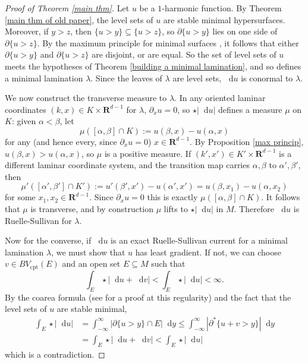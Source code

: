 \documentclass[reqno,11pt]{amsart}
\newcommand{\RR}{\mathbf{R}}
\newcommand*\dif{\mathop{}\!\mathrm{d}}
\newcommand{\cpt}{\mathrm{cpt}}
\theoremstyle{definition}
\numberwithin{equation}{section}
\begin{document}
\begin{proof}[Proof of Theorem \ref{main thm}]
Let $u$ be a $1$-harmonic function.
By Theorem \ref{main thm of old paper}, the level sets of $u$ are stable minimal hypersurfaces.
Moreover, if $y > z$, then $\{u > y\} \subseteq \{u > z\}$, so $\partial \{u > y\}$ lies on one side of $\partial \{u > z\}$.
By the maximum principle for minimal surfaces \cite[Corollary 1.28]{colding2011course}, it follows that either $\partial \{u > y\}$ and $\partial \{u > z\}$ are disjoint, or are equal.
So the set of level sets of $u$ meets the hypotheses of Theorem \ref{building a minimal lamination}, and so defines a minimal lamination $\lambda$.
Since the leaves of $\lambda$ are level sets, $\dif u$ is conormal to $\lambda$.

We now construct the transverse measure to $\lambda$.
In any oriented laminar coordinates $(k, x) \in K \times \RR^{d - 1}$ for $\lambda$, $\partial_x u = 0$, so $\star |\dif u|$ defines a measure $\mu$ on $K$: given $\alpha < \beta$, let
$$\mu([\alpha, \beta] \cap K) := u(\beta, x) - u(\alpha, x)$$
for any (and hence every, since $\partial_x u = 0$) $x \in \RR^{d - 1}$.
By Proposition \ref{max princip}, $u(\beta, x) > u(\alpha, x)$, so $\mu$ is a positive measure.
If $(k', x') \in K' \times \RR^{d - 1}$ is a different laminar coordinate system, and the transition map carries $\alpha, \beta$ to $\alpha', \beta'$, then
$$\mu'([\alpha', \beta'] \cap K') := u'(\beta', x') - u(\alpha', x') = u(\beta, x_1) - u(\alpha, x_2)$$
for some $x_1, x_2 \in \RR^{d - 1}$. Since $\partial_x u = 0$ this is exactly $\mu([\alpha, \beta] \cap K)$.
It follows that $\mu$ is transverse, and by construction $\mu$ lifts to $\star |\dif u|$ in $M$.
Therefore $\dif u$ is Ruelle-Sullivan for $\lambda$.

Now for the converse, if $\dif u$ is an exact Ruelle-Sullivan current for a minimal lamination $\lambda$, we must show that $u$ has least gradient.
If not, we can choose $v \in BV_\cpt(E)$ and an open set $E \subseteq M$ such that
$$\int_E \star |\dif u + \dif v| < \int_E \star |\dif u| < \infty.$$
By the coarea formula (see \cite[\S2]{BackusFLG} for a proof at this regularity) and the fact that the level sets of $u$ are stable minimal,
\begin{align*}
\int_E \star |\dif u| &= \int_{-\infty}^\infty |\partial \{u > y\} \cap E| \dif y \leq \int_{-\infty}^\infty |\partial^* \{u + v > y\}| \dif y \\
&= \int_E \star |\dif u + \dif v| < \int_E \star |\dif u|
\end{align*}
which is a contradiction.
\end{proof}


\printbibliography
\end{document}
